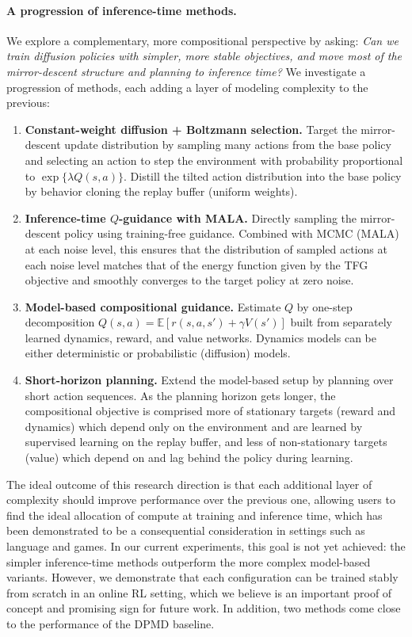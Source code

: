 \documentclass{article}
\theoremstyle{plain}
\theoremstyle{definition}
\theoremstyle{remark}
\newcommand{\E}{\mathbb{E}}
\begin{document}
\paragraph{A progression of inference-time methods.}
We explore a complementary, more compositional perspective by asking: \emph{Can we train diffusion policies with simpler, more stable objectives, and move most of the mirror-descent structure and planning to inference time?}
We investigate a progression of methods, each adding a layer of modeling complexity to the previous:
\begin{enumerate}
  \item \textbf{Constant-weight diffusion + Boltzmann selection.} Target the mirror-descent update distribution by sampling many actions from the base policy and selecting an action to step the environment with probability proportional to $\exp\{\lambda Q(s,a)\}$. Distill the tilted action distribution into the base policy by behavior cloning the replay buffer (uniform weights).
  \item \textbf{Inference-time $Q$-guidance with MALA.} Directly sampling the mirror-descent policy using training-free guidance. Combined with MCMC (MALA) at each noise level, this ensures that the distribution of sampled actions at each noise level matches that of the energy function given by the TFG objective and smoothly converges to the target policy at zero noise.
  \item \textbf{Model-based compositional guidance.} Estimate $Q$ by one-step decomposition $Q(s,a) = \E[r(s,a,s') + \gamma V(s')]$ built from separately learned dynamics, reward, and value networks. Dynamics models can be either deterministic or probabilistic (diffusion) models.
  \item \textbf{Short-horizon planning.} Extend the model-based setup by planning over short action sequences. As the planning horizon gets longer, the compositional objective is comprised more of stationary targets (reward and dynamics) which depend only on the environment and are learned by supervised learning on the replay buffer, and less of non-stationary targets (value) which depend on and lag behind the policy during learning. 
\end{enumerate}
The ideal outcome of this research direction is that each additional layer of complexity should improve performance over the previous one, allowing users to find the ideal allocation of compute at training and inference time, which has been demonstrated to be a consequential consideration in settings such as language and games.
In our current experiments, this goal is not yet achieved: the simpler inference-time methods outperform the more complex model-based variants. However, we demonstrate that each configuration can be trained stably from scratch in an online RL setting, which we believe is an important proof of concept and promising sign for future work. In addition, two methods come close to the performance of the DPMD baseline.
\end{document}
